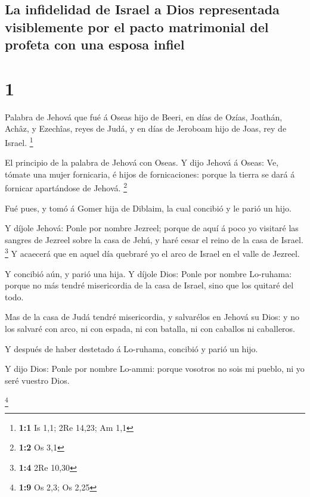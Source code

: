 \hypertarget{la-infidelidad-de-israel-a-dios-representada-visiblemente-por-el-pacto-matrimonial-del-profeta-con-una-esposa-infiel}{%
\subsection{La infidelidad de Israel a Dios representada visiblemente
por el pacto matrimonial del profeta con una esposa
infiel}\label{la-infidelidad-de-israel-a-dios-representada-visiblemente-por-el-pacto-matrimonial-del-profeta-con-una-esposa-infiel}}

\hypertarget{section}{%
\section{1}\label{section}}

 Palabra de Jehová que fué á Oseas hijo de Beeri, en días de
Ozías, Joathán, Achâz, y Ezechîas, reyes de Judá, y en días de Jeroboam
hijo de Joas, rey de Israel. \footnote{\textbf{1:1} Is 1,1; 2Re 14,23;
  Am 1,1}

 El principio de la palabra de Jehová con Oseas. Y dijo
Jehová á Oseas: Ve, tómate una mujer fornicaria, é hijos de
fornicaciones: porque la tierra se dará á fornicar apartándose de
Jehová. \footnote{\textbf{1:2} Os 3,1}

 Fué pues, y tomó á Gomer hija de Diblaim, la cual concibió
y le parió un hijo.

 Y díjole Jehová: Ponle por nombre Jezreel; porque de aquí á
poco yo visitaré las sangres de Jezreel sobre la casa de Jehú, y haré
cesar el reino de la casa de Israel. \footnote{\textbf{1:4} 2Re 10,30}
 Y acaecerá que en aquel día quebraré yo el arco de Israel
en el valle de Jezreel.

 Y concibió aún, y parió una hija. Y díjole Dios: Ponle por
nombre Lo-ruhama: porque no más tendré misericordia de la casa de
Israel, sino que los quitaré del todo.

 Mas de la casa de Judá tendré misericordia, y salvarélos en
Jehová su Dios: y no los salvaré con arco, ni con espada, ni con
batalla, ni con caballos ni caballeros.

 Y después de haber destetado á Lo-ruhama, concibió y parió
un hijo.

 Y dijo Dios: Ponle por nombre Lo-ammi: porque vosotros no
sois mi pueblo, ni yo seré vuestro Dios.

\footnote{\textbf{1:9} Os 2,3; Os 2,25}

